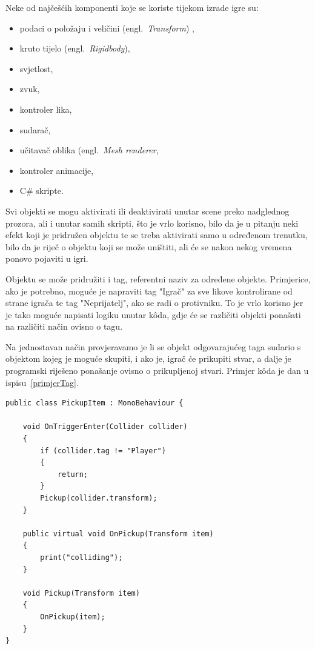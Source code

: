 Neke od najčešćih komponenti koje se koriste tijekom izrade igre su:
\begin{itemize}
  \item podaci o položaju i veličini (engl.~\textit{Transform}) ,
  \item kruto tijelo (engl.~\textit{Rigidbody}),
  \item svjetlost,
  \item zvuk,
  \item kontroler lika,
  \item sudarač,
  \item učitavač oblika (engl.~\textit{Mesh renderer},
  \item kontroler animacije,
  \item C\# skripte.
\end{itemize}

Svi objekti se mogu aktivirati ili deaktivirati unutar scene preko nadglednog prozora, ali i unutar samih skripti, što je vrlo korisno, bilo da je u pitanju neki efekt koji je pridružen objektu te se treba aktivirati samo u određenom trenutku, bilo da je riječ o objektu koji se može uništiti, ali će se nakon nekog vremena ponovo pojaviti u igri.

Objektu se može pridružiti i tag, referentni naziv za određene objekte. Primjerice, ako je potrebno, moguće je napraviti tag "Igrač" za sve likove kontrolirane od strane igrača te tag "Neprijatelj", ako se radi o protivniku. To je vrlo korisno jer je tako moguće napisati logiku unutar k\^oda, gdje će se različiti objekti ponašati na različiti način ovisno o tagu.

Na jednostavan način provjeravamo je li se objekt odgovarajućeg taga sudario s objektom kojeg je moguće skupiti, i ako je, igrač će prikupiti stvar, a dalje je programski riješeno ponašanje ovisno o prikupljenoj stvari. Primjer k\^oda je dan u ispisu~\ref{primjerTag}. 

\begin{lstlisting}[caption={Uporaba taga}, label=primjerTag]
public class PickupItem : MonoBehaviour {

    void OnTriggerEnter(Collider collider)
    {
        if (collider.tag != "Player")
        {
            return;
        }
        Pickup(collider.transform);
    }

    public virtual void OnPickup(Transform item)
    {
        print("colliding");
    }

    void Pickup(Transform item)
    {
        OnPickup(item);
    }
}
\end{lstlisting}

